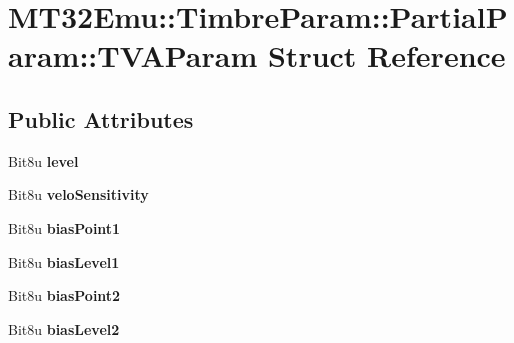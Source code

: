 \hypertarget{structMT32Emu_1_1TimbreParam_1_1PartialParam_1_1TVAParam}{\section{M\-T32\-Emu\-:\-:Timbre\-Param\-:\-:Partial\-Param\-:\-:T\-V\-A\-Param Struct Reference}
\label{structMT32Emu_1_1TimbreParam_1_1PartialParam_1_1TVAParam}
}
\subsection*{Public Attributes}
\begin{DoxyCompactItemize}
\item 
\hypertarget{structMT32Emu_1_1TimbreParam_1_1PartialParam_1_1TVAParam_ab0da07e58139ab6f75da28397e38aa72}{Bit8u {\bfseries level}}\label{structMT32Emu_1_1TimbreParam_1_1PartialParam_1_1TVAParam_ab0da07e58139ab6f75da28397e38aa72}

\item 
\hypertarget{structMT32Emu_1_1TimbreParam_1_1PartialParam_1_1TVAParam_a0ef8ecab8b6de7b32905e028b202a2fa}{Bit8u {\bfseries velo\-Sensitivity}}\label{structMT32Emu_1_1TimbreParam_1_1PartialParam_1_1TVAParam_a0ef8ecab8b6de7b32905e028b202a2fa}

\item 
\hypertarget{structMT32Emu_1_1TimbreParam_1_1PartialParam_1_1TVAParam_a9357b4943adaf4f8427211e1eeb981c9}{Bit8u {\bfseries bias\-Point1}}\label{structMT32Emu_1_1TimbreParam_1_1PartialParam_1_1TVAParam_a9357b4943adaf4f8427211e1eeb981c9}

\item 
\hypertarget{structMT32Emu_1_1TimbreParam_1_1PartialParam_1_1TVAParam_a3a67032ef6e896fbf34d8c4c30c65932}{Bit8u {\bfseries bias\-Level1}}\label{structMT32Emu_1_1TimbreParam_1_1PartialParam_1_1TVAParam_a3a67032ef6e896fbf34d8c4c30c65932}

\item 
\hypertarget{structMT32Emu_1_1TimbreParam_1_1PartialParam_1_1TVAParam_a29c97b83f3b6b0ecc32387edd09817ca}{Bit8u {\bfseries bias\-Point2}}\label{structMT32Emu_1_1TimbreParam_1_1PartialParam_1_1TVAParam_a29c97b83f3b6b0ecc32387edd09817ca}

\item 
\hypertarget{structMT32Emu_1_1TimbreParam_1_1PartialParam_1_1TVAParam_a3165e5ca54ac3251030cceaf0ac7ad39}{Bit8u {\bfseries bias\-Level2}}\label{structMT32Emu_1_1TimbreParam_1_1PartialParam_1_1TVAParam_a3165e5ca54ac3251030cceaf0ac7ad39}


\end{DoxyCompactItemize}

